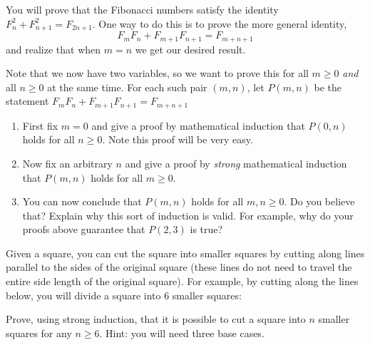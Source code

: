 \documentclass[11pt,]{book}
\theoremstyle{ptxplainnotitle}
\theoremstyle{ptxplaintitle}
\theoremstyle{ptxdefinitionnotitle}
\theoremstyle{ptxdefinitiontitle}
\theoremstyle{ptxdefinitionnotitle}
\theoremstyle{ptxdefinitiontitle}
\theoremstyle{ptxdefinitionnotitle}
\theoremstyle{ptxdefinitiontitle}
\theoremstyle{ptxdefinitiontitlenonumber}
\theoremstyle{ptxdefinitiontitlenonumber}
\numberwithin{equation}{chapter}
\begin{document}
\begin{divisionexercise}{24}\hypertarget{exercise-77}{}
\hypertarget{p-662}{}%
You will prove that the Fibonacci numbers satisfy the identity \(F_n^2 + F_{n+1}^2 = F_{2n+1}\). One way to do this is to prove the more general identity,%
\begin{equation*}
F_mF_n + F_{m+1}F_{n+1} = F_{m+n+1}
\end{equation*}
and realize that when \(m = n\) we get our desired result.%
\par
\hypertarget{p-663}{}%
Note that we now have two variables, so we want to prove this for all \(m \ge 0\) \emph{and} all \(n \ge 0\) at the same time. For each such pair \((m,n)\), let \(P(m,n)\) be the statement \(F_mF_n + F_{m+1}F_{n+1} = F_{m+n+1}\) \leavevmode%
\begin{enumerate}[label=(\alph*)]
\item\hypertarget{li-250}{}\hypertarget{p-664}{}%
First fix \(m = 0\) and give a proof by mathematical induction that \(P(0,n)\) holds for all \(n \ge 0\).  Note this proof will be very easy.%
\item\hypertarget{li-251}{}\hypertarget{p-665}{}%
Now fix an arbitrary \(n\) and give a proof by \emph{strong} mathematical induction that \(P(m,n)\) holds for all \(m \ge 0\).%
\item\hypertarget{li-252}{}\hypertarget{p-666}{}%
You can now conclude that \(P(m,n)\) holds for all \(m,n\ge 0\).  Do you believe that?  Explain why this sort of induction is valid.  For example, why do your proofs above guarantee that \(P(2,3)\) is true?%
\end{enumerate}
%
\end{divisionexercise}%
\begin{divisionexercise}{25}\hypertarget{exercise-78}{}
\hypertarget{p-667}{}%
Given a square, you can cut the square into smaller squares by cutting along lines parallel to the sides of the original square (these lines do not need to travel the entire side length of the original square).  For example, by cutting along the lines below, you will divide a square into 6 smaller squares:%
\begin{sidebyside}{1}{0.325}{0.325}{0}
\begin{sbspanel}{0.35}
\end{sbspanel}
\end{sidebyside}
\par
\hypertarget{p-668}{}%
Prove, using strong induction, that it is possible to cut a square into \(n\) smaller squares for any \(n \ge 6\).  Hint: you will need three base cases.%
\end{divisionexercise}%
\typeout{************************************************}
\typeout{************************************************}
\end{document}

